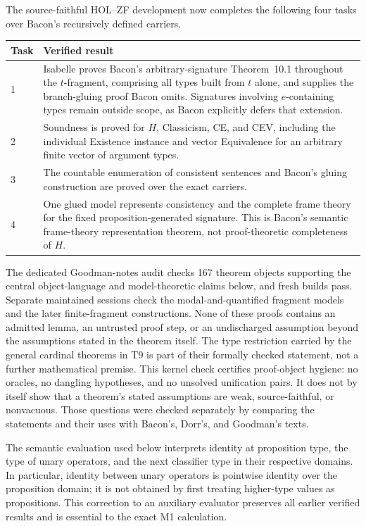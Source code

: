 \documentclass[12pt,leqno]{article}
\theoremstyle{plain}
\theoremstyle{definition}
\begin{document}
The source-faithful HOL--ZF development now completes the following four
tasks over Bacon's recursively defined carriers.

\begin{longtable}{@{}p{}p{}@{}}
\toprule
Task & Verified result \\
\midrule
\endhead
1 & Isabelle proves Bacon's arbitrary-signature Theorem~10.1 throughout the
\(t\)-fragment, comprising all types built from \(t\) alone, and supplies the
branch-gluing proof Bacon omits.  Signatures involving \(e\)-containing types
remain outside scope, as Bacon explicitly defers that extension. \\
2 & Soundness is proved for \(H\), Classicism, CE, and CEV, including the
individual Existence instance and vector Equivalence for an arbitrary finite
vector of argument types. \\
3 & The countable enumeration of consistent sentences and Bacon's gluing
construction are proved over the exact carriers. \\
4 & One glued model represents consistency and the complete frame theory for
the fixed proposition-generated signature.  This is Bacon's semantic
frame-theory representation theorem, not proof-theoretic completeness of
\(H\). \\
\bottomrule
\end{longtable}

The dedicated Goodman-notes audit checks 167 theorem objects supporting the
central object-language and model-theoretic claims below, and fresh builds
pass.  Separate maintained sessions check the modal-and-quantified fragment
models and the later finite-fragment constructions.  None
of these proofs contains an admitted lemma,
an untrusted proof step, or an undischarged assumption beyond the assumptions
stated in the theorem itself.  The type restriction carried by the general
cardinal theorems in T9 is part of their formally checked statement, not a
further mathematical premise.
This kernel check certifies proof-object hygiene: no oracles, no dangling
hypotheses, and no unsolved unification pairs.  It does not by itself show
that a theorem's stated assumptions are weak, source-faithful, or
nonvacuous.  Those questions were checked separately by comparing the
statements and their uses with Bacon's, Dorr's, and Goodman's texts.

The semantic evaluation used below interprets identity at proposition type,
the type of unary operators, and the next classifier type in their respective
domains.  In particular, identity between unary operators is pointwise
identity over the proposition domain; it is not obtained by first treating
higher-type values as propositions.  This correction to an auxiliary
evaluator preserves all earlier verified results and is essential to the
exact M1 calculation.
\end{document}
